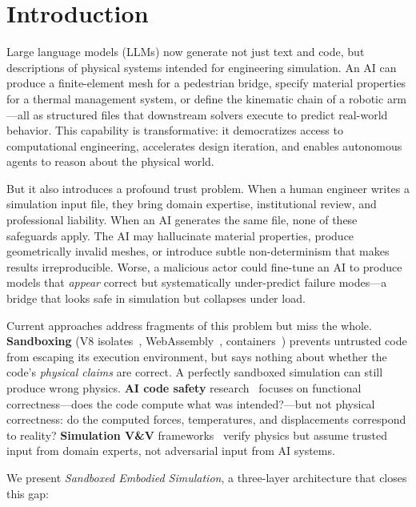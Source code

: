 \documentclass[letterpaper,twocolumn,10pt]{article}
\begin{document}
\section{Introduction}
\label{sec:intro}

Large language models (LLMs) now generate not just text and code, but
descriptions of physical systems intended for engineering simulation.
An AI can produce a finite-element mesh for a pedestrian bridge, specify
material properties for a thermal management system, or define the
kinematic chain of a robotic arm---all as structured files that
downstream solvers execute to predict real-world behavior. This
capability is transformative: it democratizes access to computational
engineering, accelerates design iteration, and enables autonomous
agents to reason about the physical world.

But it also introduces a profound trust problem. When a human engineer
writes a simulation input file, they bring domain expertise, institutional
review, and professional liability. When an AI generates the same file,
none of these safeguards apply. The AI may hallucinate material properties,
produce geometrically invalid meshes, or introduce subtle non-determinism
that makes results irreproducible. Worse, a malicious actor could
fine-tune an AI to produce models that \emph{appear} correct but
systematically under-predict failure modes---a bridge that looks safe
in simulation but collapses under load.

Current approaches address fragments of this problem but miss the whole.
\textbf{Sandboxing} (V8 isolates~\cite{nickel2020isolate}, WebAssembly~\cite{haas2017wasm},
containers~\cite{merkel2014docker}) prevents untrusted code from escaping
its execution environment, but says nothing about whether the code's
\emph{physical claims} are correct. A perfectly sandboxed simulation
can still produce wrong physics. \textbf{AI code safety}
research~\cite{chen2021codex,li2023codegeneration} focuses on functional
correctness---does the code compute what was intended?---but not physical
correctness: do the computed forces, temperatures, and displacements
correspond to reality? \textbf{Simulation V\&V}
frameworks~\cite{asme2009vv20,oberkampf2010verification} verify physics
but assume trusted input from domain experts, not adversarial input from
AI systems.

We present \emph{Sandboxed Embodied Simulation}, a three-layer
architecture that closes this gap:
\end{document}
